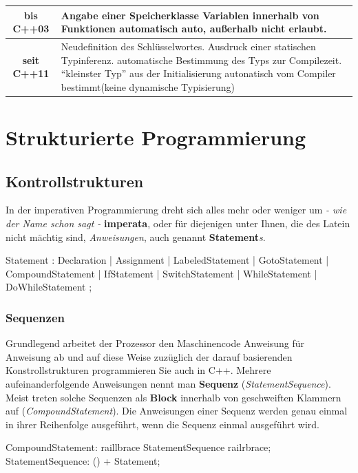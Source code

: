 \documentclass[a4paper]{report}
\begin{document}
\begin{center}
	\begin{tabular}{|c|p{12cm}|}
		\hline
		\textbf{bis C++03} & Angabe einer Speicherklasse \newline Variablen innerhalb von Funktionen automatisch auto, außerhalb nicht erlaubt. \\ \hline
		\textbf{seit C++11} & Neudefinition des Schlüsselwortes. \newline Ausdruck einer statischen Typinferenz. \newline automatische Bestimmung des Typs zur Compilezeit. \newline
		"`kleinster Typ"' aus der Initialisierung autonatisch vom Compiler bestimmt\newline (keine dynamische Typisierung)\\ \hline
	\end{tabular}
\end{center}

\chapter{Strukturierte Programmierung}
\section{Kontrollstrukturen}

In der imperativen Programmierung dreht sich alles mehr oder weniger um \textit{- wie der Name schon sagt -} \textbf{imperata}, oder für diejenigen unter Ihnen, die des Latein nicht mächtig sind, \textit{Anweisungen}, auch genannt \textbf{Statement}\textit{s}.

\begin{rail}
	Statement : Declaration |%
				Assignment |
				LabeledStatement |
				GotoStatement |
				CompoundStatement |
				IfStatement |
				SwitchStatement |
				WhileStatement |
				DoWhileStatement
				;
				
\end{rail}

\subsection{Sequenzen}
Grundlegend arbeitet der Prozessor den Maschinencode Anweisung für Anweisung ab und auf diese Weise zuzüglich der darauf basierenden Konstrollstrukturen programmieren Sie auch in C++. Mehrere aufeinanderfolgende Anweisungen nennt man \textbf{Sequenz} (\textit{StatementSequence}). Meist treten solche Sequenzen als \textbf{Block} innerhalb von geschweiften Klammern auf (\textit{CompoundStatement}). Die Anweisungen einer Sequenz werden genau einmal in ihrer Reihenfolge ausgeführt, wenn die Sequenz einmal ausgeführt wird.
\begin{rail}
	CompoundStatement: raillbrace StatementSequence railrbrace;
	StatementSequence:	() + Statement;	
\end{rail}
\end{document}
